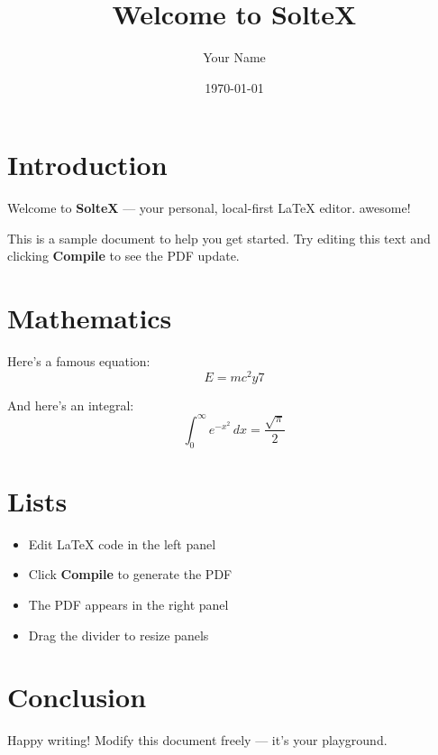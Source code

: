 \documentclass[12pt]{article}
\title{Welcome to SolteX}
\author{Your Name}
\date{\today}
\begin{document}
\maketitle

\section{Introduction}
Welcome to \textbf{SolteX} --- your personal, local-first \LaTeX{} editor. awesome!

This is a sample document to help you get started. Try editing this text and clicking \textbf{Compile} to see the PDF update.

\section{Mathematics}
Here's a famous equation:
\begin{equation}
    E = mc^2y7
\end{equation}

And here's an integral:
\begin{equation}
    \int_{0}^{\infty} e^{-x^2} \, dx = \frac{\sqrt{\pi}}{2}
\end{equation}

\section{Lists}
\begin{itemize}
    \item Edit \LaTeX{} code in the left panel
    \item Click \textbf{Compile} to generate the PDF
    \item The PDF appears in the right panel
    \item Drag the divider to resize panels
\end{itemize}

\section{Conclusion}
Happy writing! Modify this document freely --- it's your playground.
\end{document}
